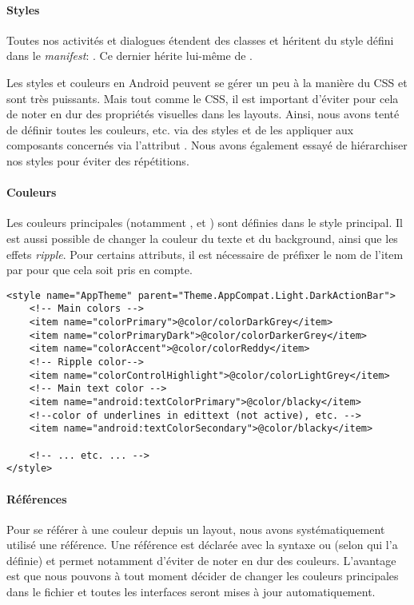 \paragraph*{Styles} Toutes nos activités et dialogues étendent des classes  et héritent du style défini dans le \emph{manifest}: . Ce dernier hérite lui-même de .

Les styles et couleurs en Android peuvent se gérer un peu à la manière du CSS et sont très puissants. Mais tout comme le CSS, il est important d'éviter pour cela de noter en dur des propriétés visuelles dans les layouts. Ainsi, nous avons tenté de définir toutes les couleurs, etc. via des styles et de les appliquer aux composants concernés via l'attribut . Nous avons également essayé de hiérarchiser nos styles pour éviter des répétitions.

\paragraph*{Couleurs} Les couleurs principales (notamment ,  et ) sont définies dans le style principal. Il est aussi possible de changer la couleur du texte et du background, ainsi que les effets \emph{ripple}. Pour certains attributs, il est nécessaire de préfixer le nom de l'item par  pour que cela soit pris en compte.

\begin{verbatim}
<style name="AppTheme" parent="Theme.AppCompat.Light.DarkActionBar">
    <!-- Main colors -->
    <item name="colorPrimary">@color/colorDarkGrey</item>
    <item name="colorPrimaryDark">@color/colorDarkerGrey</item>
    <item name="colorAccent">@color/colorReddy</item>
    <!-- Ripple color-->
    <item name="colorControlHighlight">@color/colorLightGrey</item>
    <!-- Main text color -->
    <item name="android:textColorPrimary">@color/blacky</item>
    <!--color of underlines in edittext (not active), etc. -->
    <item name="android:textColorSecondary">@color/blacky</item>

    <!-- ... etc. ... -->
</style>
\end{verbatim}

\paragraph*{Références} Pour se référer à une couleur depuis un layout, nous avons systématiquement utilisé une référence. Une référence est déclarée avec la syntaxe  ou  (selon qui l'a définie) et permet notamment d'éviter de noter en dur des couleurs. L'avantage est que nous pouvons à tout moment décider de changer les couleurs principales dans le fichier  et toutes les interfaces seront mises à jour automatiquement.

